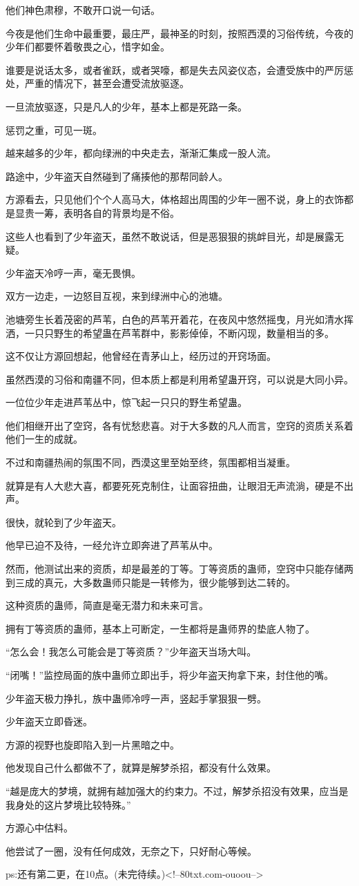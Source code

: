 \begin{this_body}
他们神色肃穆，不敢开口说一句话。

今夜是他们生命中最重要，最庄严，最神圣的时刻，按照西漠的习俗传统，今夜的少年们都要怀着敬畏之心，惜字如金。

谁要是说话太多，或者雀跃，或者哭嚎，都是失去风姿仪态，会遭受族中的严厉惩处，严重的情况下，甚至会遭受流放驱逐。

一旦流放驱逐，只是凡人的少年，基本上都是死路一条。

惩罚之重，可见一斑。

越来越多的少年，都向绿洲的中央走去，渐渐汇集成一股人流。

路途中，少年盗天自然碰到了痛揍他的那帮同龄人。

方源看去，只见他们个个人高马大，体格超出周围的少年一圈不说，身上的衣饰都是显贵一筹，表明各自的背景均是不俗。

这些人也看到了少年盗天，虽然不敢说话，但是恶狠狠的挑衅目光，却是展露无疑。

少年盗天冷哼一声，毫无畏惧。

双方一边走，一边怒目互视，来到绿洲中心的池塘。

池塘旁生长着茂密的芦苇，白色的芦苇开着花，在夜风中悠然摇曳，月光如清水挥洒，一只只野生的希望蛊在芦苇群中，影影倬倬，不断闪现，数量相当的多。

这不仅让方源回想起，他曾经在青茅山上，经历过的开窍场面。

虽然西漠的习俗和南疆不同，但本质上都是利用希望蛊开窍，可以说是大同小异。

一位位少年走进芦苇丛中，惊飞起一只只的野生希望蛊。

他们相继开出了空窍，各有忧愁悲喜。对于大多数的凡人而言，空窍的资质关系着他们一生的成就。

不过和南疆热闹的氛围不同，西漠这里至始至终，氛围都相当凝重。

就算是有人大悲大喜，都要死死克制住，让面容扭曲，让眼泪无声流淌，硬是不出声。

很快，就轮到了少年盗天。

他早已迫不及待，一经允许立即奔进了芦苇从中。

然而，他测试出来的资质，却是最差的丁等。丁等资质的蛊师，空窍中只能存储两到三成的真元，大多数蛊师只能是一转修为，很少能够到达二转的。

这种资质的蛊师，简直是毫无潜力和未来可言。

拥有丁等资质的蛊师，基本上可断定，一生都将是蛊师界的垫底人物了。

“怎么会！我怎么可能会是丁等资质？”少年盗天当场大叫。

“闭嘴！”监控局面的族中蛊师立即出手，将少年盗天拘拿下来，封住他的嘴。

少年盗天极力挣扎，族中蛊师冷哼一声，竖起手掌狠狠一劈。

少年盗天立即昏迷。

方源的视野也旋即陷入到一片黑暗之中。

他发现自己什么都做不了，就算是解梦杀招，都没有什么效果。

“越是庞大的梦境，就拥有越加强大的约束力。不过，解梦杀招没有效果，应当是我身处的这片梦境比较特殊。”

方源心中估料。

他尝试了一圈，没有任何成效，无奈之下，只好耐心等候。

ps:还有第二更，在10点。(未完待续。)<!--80txt.com-ouoou-->

\end{this_body}

